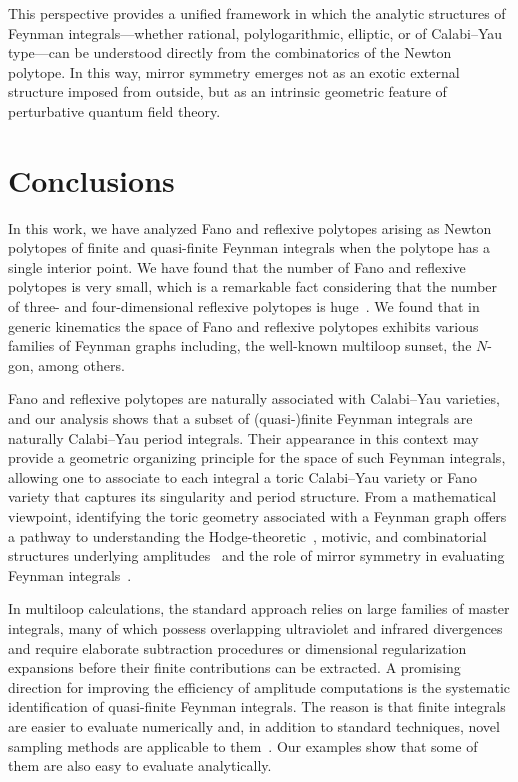 \documentclass[12pt,a4paper]{article}
\theoremstyle{plain}
\theoremstyle{remark}
\newcommand{\nprops}{N}
\begin{document}
This perspective provides a unified framework in which the analytic structures of Feynman integrals---whether rational, polylogarithmic, elliptic, or of Calabi--Yau type---can be understood directly from the combinatorics of the Newton polytope. In this way, mirror symmetry emerges not as an exotic external structure imposed from outside, but as an intrinsic geometric feature of perturbative quantum field theory.

\section{Conclusions}\label{sec:conclusion}

In this work, we have analyzed Fano and reflexive polytopes arising as Newton polytopes of finite and quasi-finite Feynman integrals when the polytope has a single interior point.
We have found that the number of Fano and reflexive polytopes
is very small, which is a remarkable fact considering that the number of three-  and four-dimensional reflexive polytopes is huge~\cite{Kreuzer:2000xy}. We found that in generic kinematics the space of Fano and reflexive polytopes exhibits various families of Feynman graphs including, the well-known multiloop sunset, the $\nprops$-gon, among others. 

Fano and reflexive polytopes are naturally associated with Calabi--Yau varieties, and
our analysis shows that a subset of (quasi-)finite Feynman integrals are
naturally  Calabi--Yau period integrals. Their appearance in this context may provide a geometric organizing principle for the space of such Feynman integrals, allowing one to associate to each integral a toric Calabi--Yau variety or Fano variety that captures its singularity and period structure.
From a mathematical viewpoint, identifying the toric geometry associated with a Feynman graph offers a pathway to understanding the Hodge-theoretic~\cite{Bloch:2013tra,Bloch:2014qca,Bloch:2016izu,Doran:2023yzu}, motivic, and combinatorial structures underlying amplitudes~\cite{Brown:2015fyf, Schnetz:2016fhy, Panzer:2018tiv} and the role of mirror symmetry in evaluating Feynman integrals~\cite{Bloch:2014qca,Bloch:2016izu}.


In multiloop calculations, the standard approach relies on
large families of master integrals, many of which possess overlapping
ultraviolet and infrared divergences and require elaborate subtraction procedures or
dimensional regularization expansions before their finite
contributions can be extracted.  
A promising direction for improving the efficiency of amplitude
computations is the systematic identification of quasi-finite Feynman
integrals. The reason is that finite integrals are easier to evaluate numerically and, in addition to standard techniques, novel sampling methods are applicable to them~\cite{Borinsky:2023jdv, Borinsky:2020rqs}. Our examples show that some of them are also easy to evaluate analytically.
\end{document}

